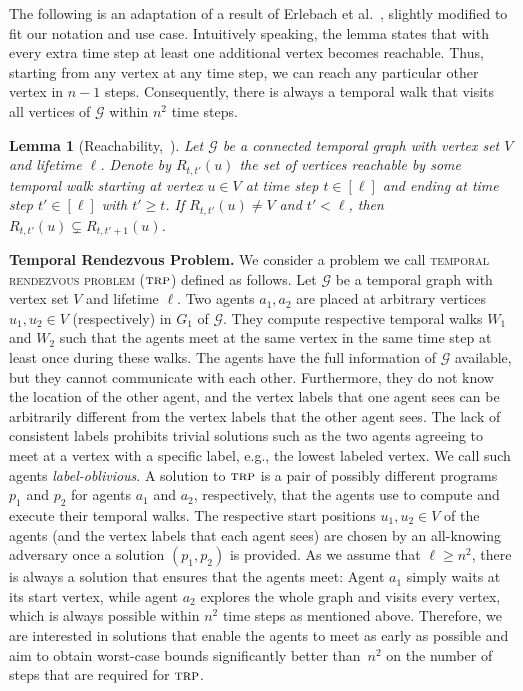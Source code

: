 \documentclass[10pt,a4paper]{article}
\newtheorem{lemma}{Lemma}[section]
\newcommand{\trp}{\textsc{trp}}
\begin{document}
The following is an adaptation of a result of Erlebach et
al.~\cite{ErlebachHK21}, slightly modified to fit our notation and use case.
Intuitively speaking, the lemma states that with every extra time step at least
one additional vertex becomes reachable. Thus, starting from any vertex at any
time step, we can reach any particular other vertex in $n-1$ steps.
Consequently, there is always a temporal walk that visits all vertices of
$\mathcal{G}$ within $n^2$ time steps. 

\begin{lemma}[Reachability,~\cite{ErlebachHK21}]\label{lem:reachability} Let
    $\mathcal{G}$ be a connected temporal graph with vertex set $V$ and lifetime
    $\ell$. Denote by $R_{t, t'}(u)$ the set of vertices reachable by some
    temporal walk starting at vertex $u \in V$ at time step $t \in [\ell]$ and
    ending at time step $t' \in [\ell]$ with $t'\ge t$. If $R_{t,t'}(u)\neq V$
    and $t'<\ell$, then $R_{t,t'}(u) \subsetneq R_{t, t'+1}(u)$.
\end{lemma}



\noindent \textbf{Temporal Rendezvous Problem.} We consider a problem we call
\textsc{temporal rendezvous problem} ($\trp$) defined as follows. Let
$\mathcal{G}$ be a temporal graph with vertex set $V$ and lifetime $\ell$. Two
agents $a_1, a_2$ are placed at arbitrary vertices $u_1, u_2 \in V$
(respectively) in $G_1$ of $\mathcal{G}$. They compute respective temporal walks
$W_{1}$ and $W_{2}$ such that the agents meet at the same vertex in the same
time step at least once during these walks. The agents have the full information
of $\mathcal{G}$ available, but they cannot communicate with each other.
Furthermore, they do not know the location of the other agent, and the vertex
labels that one agent sees can be arbitrarily different from the vertex labels
that the other agent sees. The lack of consistent labels prohibits trivial
solutions such as the two agents agreeing to meet at a vertex with a specific
label, e.g., the lowest labeled vertex. We call such agents
\textit{label-oblivious}. A solution to $\trp$ is a pair of possibly different
programs $p_1$ and $p_2$ for agents $a_1$ and $a_2$, respectively, that the
agents use to compute and execute their temporal walks. The respective start
positions $u_1, u_2 \in V$ of the agents {(and the vertex labels that each
agent sees)} are chosen by an all-knowing adversary once a solution $(p_1, p_2)$
is provided. {As we assume that $\ell\ge n^2$, there is always a solution
that ensures that the agents meet: Agent $a_1$ simply waits at its start vertex,
while agent $a_2$ explores the whole graph and visits every vertex, which is
always possible within $n^2$ time steps as mentioned above. Therefore, we are
interested in solutions that enable the agents to meet as early as possible and
aim to obtain worst-case bounds significantly better than~$n^2$ on the number of
steps that are required for $\trp$.}
\end{document}
